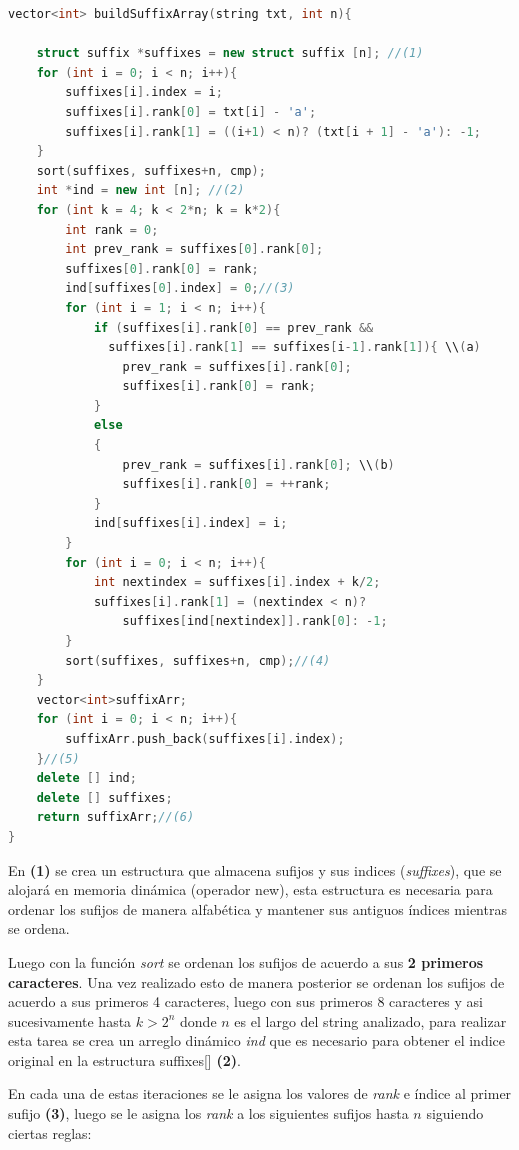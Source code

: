 \begin{lstlisting}[language=C++, caption=Función principal arreglo de sufijos (1)]
vector<int> buildSuffixArray(string txt, int n){

	struct suffix *suffixes = new struct suffix [n]; //(1)
	for (int i = 0; i < n; i++){
		suffixes[i].index = i;
		suffixes[i].rank[0] = txt[i] - 'a';
		suffixes[i].rank[1] = ((i+1) < n)? (txt[i + 1] - 'a'): -1;
	}
	sort(suffixes, suffixes+n, cmp); 
	int *ind = new int [n]; //(2)
	for (int k = 4; k < 2*n; k = k*2){
		int rank = 0;
		int prev_rank = suffixes[0].rank[0];
		suffixes[0].rank[0] = rank;
		ind[suffixes[0].index] = 0;//(3)
		for (int i = 1; i < n; i++){
			if (suffixes[i].rank[0] == prev_rank && 
			  suffixes[i].rank[1] == suffixes[i-1].rank[1]){ \\(a)
				prev_rank = suffixes[i].rank[0];
				suffixes[i].rank[0] = rank;
			}
			else
			{
				prev_rank = suffixes[i].rank[0]; \\(b)
				suffixes[i].rank[0] = ++rank;
			}
			ind[suffixes[i].index] = i;
		}
		for (int i = 0; i < n; i++){
			int nextindex = suffixes[i].index + k/2;
			suffixes[i].rank[1] = (nextindex < n)?
			    suffixes[ind[nextindex]].rank[0]: -1;
		}
		sort(suffixes, suffixes+n, cmp);//(4)
	}
	vector<int>suffixArr;
	for (int i = 0; i < n; i++){
        suffixArr.push_back(suffixes[i].index);
    }//(5)
	delete [] ind;
	delete [] suffixes;
	return suffixArr;//(6)
}

\end{lstlisting}

En \textbf{(1)} se crea un estructura que almacena sufijos y sus indices (\textit{suffixes}), que se alojará en memoria dinámica (operador new), esta estructura es necesaria para ordenar los sufijos de manera alfabética y mantener sus antiguos índices mientras se ordena. 

Luego con la función \textit{sort} se ordenan los sufijos de acuerdo a sus \textbf{2 primeros caracteres}. Una vez realizado esto de manera posterior se ordenan los sufijos de acuerdo a sus primeros 4 caracteres, luego con sus primeros 8 caracteres y asi sucesivamente hasta $k > 2^{n}$ donde $n$ es el largo del string analizado, para realizar esta tarea se crea un arreglo dinámico \textit{ind} que es necesario para obtener el indice original en la estructura suffixes[] \textbf{(2)}.

En cada una de estas iteraciones se le asigna los valores de \textit{rank} e índice al primer sufijo \textbf{(3)}, luego se le asigna los \textit{rank} a los siguientes sufijos hasta $n$ siguiendo ciertas reglas:


